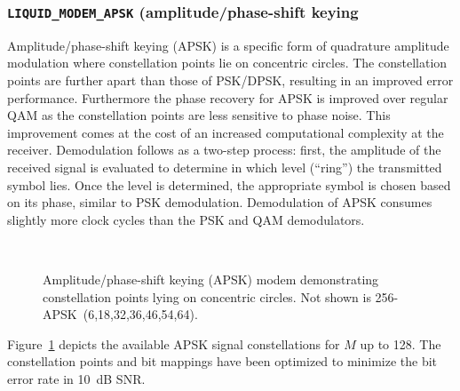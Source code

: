 \subsubsection{{\tt LIQUID\_MODEM\_APSK} (amplitude/phase-shift keying}
\label{module:modem:digital:APSK}
Amplitude/phase-shift keying (APSK) is a specific form of quadrature
amplitude modulation where constellation points lie on concentric
circles.
The constellation points are further apart than those of PSK/DPSK,
resulting in an improved error performance.
Furthermore the phase recovery for APSK is improved over regular QAM as
the constellation points are less sensitive to phase noise.
This improvement comes at the cost of an increased computational
complexity at the receiver.
%
Demodulation follows as a two-step process: first, the amplitude of the
received signal is evaluated to determine in which level (``ring'') the
transmitted symbol lies.
Once the level is determined, the appropriate symbol is chosen based on
its phase, similar to PSK demodulation.
Demodulation of APSK consumes slightly more clock cycles than the PSK
and QAM demodulators.
%
\begin{figure}
\centering
\mbox{
   \quad
   \quad
}
\mbox{
   \quad
   \quad
}
\mbox{
   \quad
   \quad
}
\caption{
    Amplitude/phase-shift keying (APSK) modem demonstrating
    constellation points lying on concentric circles.
    Not shown is 256-APSK~(6,18,32,36,46,54,64).
}
\label{fig:modem:apsk}
\end{figure}
%
Figure~\ref{fig:modem:apsk} depicts the available APSK signal
constellations for $M$ up to 128.
The constellation points and bit mappings have been optimized to
minimize the bit error rate in 10~dB SNR.



